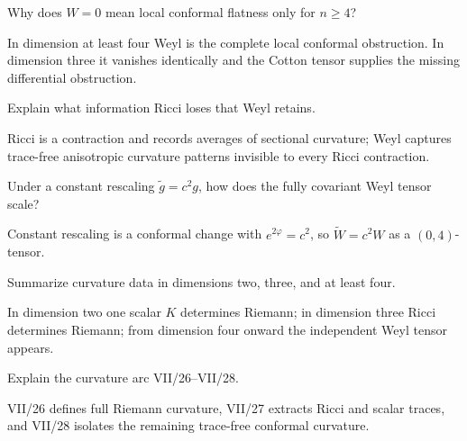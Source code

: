 \begin{problem}\label{prob:vii28-08}
Why does \(W=0\) mean local conformal flatness only for \(n\ge4\)?
\end{problem}
\begin{solution}
In dimension at least four Weyl is the complete local conformal obstruction. In dimension three it vanishes identically and the Cotton tensor supplies the missing differential obstruction.
\end{solution}

\begin{problem}\label{prob:vii28-09}
Explain what information Ricci loses that Weyl retains.
\end{problem}
\begin{solution}
Ricci is a contraction and records averages of sectional curvature; Weyl captures trace-free anisotropic curvature patterns invisible to every Ricci contraction.
\end{solution}

\begin{problem}\label{prob:vii28-10}
Under a constant rescaling \(\widetilde g=c^2g\), how does the fully covariant Weyl tensor scale?
\end{problem}
\begin{solution}
Constant rescaling is a conformal change with \(e^{2\varphi}=c^2\), so \(\widetilde W=c^2W\) as a \((0,4)\)-tensor.
\end{solution}

\begin{problem}\label{prob:vii28-11}
Summarize curvature data in dimensions two, three, and at least four.
\end{problem}
\begin{solution}
In dimension two one scalar \(K\) determines Riemann; in dimension three Ricci determines Riemann; from dimension four onward the independent Weyl tensor appears.
\end{solution}

\begin{problem}\label{prob:vii28-12}
Explain the curvature arc VII/26--VII/28.
\end{problem}
\begin{solution}
VII/26 defines full Riemann curvature, VII/27 extracts Ricci and scalar traces, and VII/28 isolates the remaining trace-free conformal curvature.
\end{solution}

